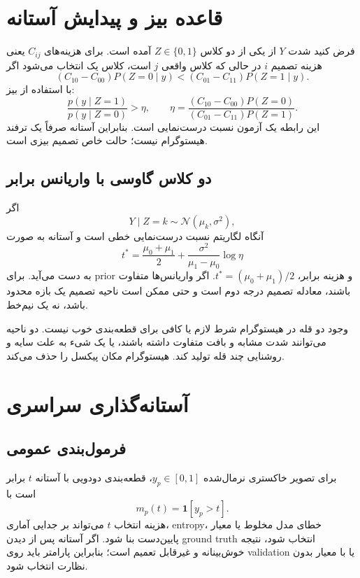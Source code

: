 \documentclass[12pt,openany,oneside]{book}
\newcommand{\ind}{\mathbf 1}
\begin{document}
\section{قاعده بیز و پیدایش آستانه}
فرض کنید شدت \(Y\) از یکی از دو کلاس \(Z\in\{0,1\}\) آمده است. برای هزینه‌های
\(C_{ij}\) یعنی هزینه تصمیم \(i\) در حالی که کلاس واقعی \(j\) است، کلاس یک انتخاب می‌شود اگر
\[
(C_{10}-C_{00})P(Z=0\mid y)
< (C_{01}-C_{11})P(Z=1\mid y).
\]
با استفاده از بیز:
\[
\frac{p(y\mid Z=1)}{p(y\mid Z=0)}
>
\eta,
\qquad
\eta=
\frac{(C_{10}-C_{00})P(Z=0)}{(C_{01}-C_{11})P(Z=1)}.
\]
این رابطه یک آزمون نسبت درست‌نمایی است. بنابراین آستانه صرفاً یک ترفند هیستوگرام نیست؛ حالت خاص تصمیم بیزی است.

\subsection{دو کلاس گاوسی با واریانس برابر}
اگر
\[
Y\mid Z=k\sim\mathcal N(\mu_k,\sigma^2),
\]
آنگاه لگاریتم نسبت درست‌نمایی خطی است و آستانه به صورت
\[
t^*=\frac{\mu_0+\mu_1}{2}
+\frac{\sigma^2}{\mu_1-\mu_0}\log\eta
\]
به دست می‌آید. برای prior و هزینه برابر، \(t^*=(\mu_0+\mu_1)/2\). اگر واریانس‌ها متفاوت باشند، معادله تصمیم
درجه دوم است و حتی ممکن است ناحیه تصمیم یک بازه محدود باشد، نه یک نیم‌خط.

\begin{warningbox}
وجود دو قله در هیستوگرام شرط لازم یا کافی برای قطعه‌بندی خوب نیست. دو ناحیه می‌توانند شدت مشابه و بافت متفاوت
داشته باشند، یا یک شیء به علت سایه و روشنایی چند قله تولید کند. هیستوگرام مکان پیکسل را حذف می‌کند.
\end{warningbox}

\section{آستانه‌گذاری سراسری}
\subsection{فرمول‌بندی عمومی}
برای تصویر خاکستری نرمال‌شده \(y_p\in[0,1]\)، قطعه‌بندی دودویی با آستانه \(t\) برابر است با
\[
m_p(t)=\ind[y_p>t].
\]
هزینه انتخاب \(t\) می‌تواند بر جدایی آماری، entropy، خطای مدل مخلوط یا معیار پایین‌دست بنا شود. اگر آستانه پس از
دیدن ground truth انتخاب شود، نتیجه خوش‌بینانه و غیرقابل تعمیم است؛ بنابراین پارامتر باید روی validation یا با معیار
بدون نظارت انتخاب شود.
\end{document}
